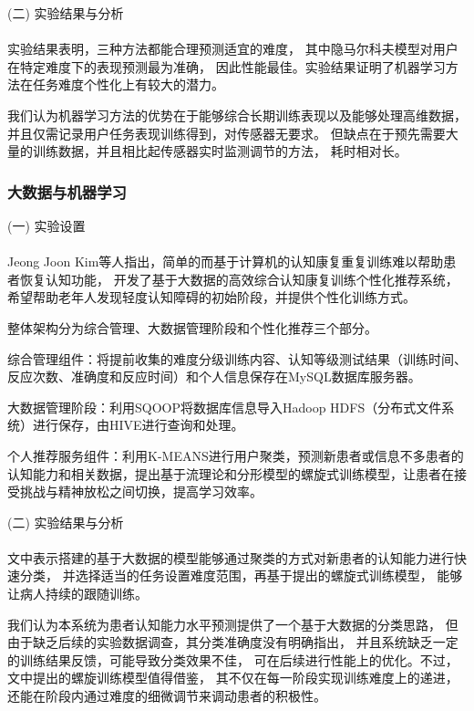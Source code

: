 \documentclass{article}
\begin{document}
            (二) 实验结果与分析\paragraph{}
            实验结果表明，三种方法都能合理预测适宜的难度，
            其中隐马尔科夫模型对用户在特定难度下的表现预测最为准确，
            因此性能最佳。实验结果证明了机器学习方法在任务难度个性化上有较大的潜力。

            我们认为机器学习方法的优势在于能够综合长期训练表现以及能够处理高维数据，
            并且仅需记录用户任务表现训练得到，对传感器无要求。
            但缺点在于预先需要大量的训练数据，并且相比起传感器实时监测调节的方法，
            耗时相对长。

            \subsubsection{大数据与机器学习}
            (一) 实验设置\paragraph{}
            Jeong Joon Kim等人指出，简单的而基于计算机的认知康复重复训练难以帮助患者恢复认知功能，
            开发了基于大数据的高效综合认知康复训练个性化推荐系统，
            希望帮助老年人发现轻度认知障碍的初始阶段，并提供个性化训练方式。

            整体架构分为综合管理、大数据管理阶段和个性化推荐三个部分。

            综合管理组件：将提前收集的难度分级训练内容、认知等级测试结果（训练时间、反应次数、准确度和反应时间）和个人信息保存在MySQL数据库服务器。
 
            大数据管理阶段：利用SQOOP将数据库信息导入Hadoop HDFS（分布式文件系统）进行保存，由HIVE进行查询和处理。

            个人推荐服务组件：利用K-MEANS进行用户聚类，预测新患者或信息不多患者的认知能力和相关数据，提出基于流理论和分形模型的螺旋式训练模型，让患者在接受挑战与精神放松之间切换，提高学习效率。

            (二) 实验结果与分析\paragraph{}
            文中表示搭建的基于大数据的模型能够通过聚类的方式对新患者的认知能力进行快速分类，
            并选择适当的任务设置难度范围，再基于提出的螺旋式训练模型，
            能够让病人持续的跟随训练。

            我们认为本系统为患者认知能力水平预测提供了一个基于大数据的分类思路，
            但由于缺乏后续的实验数据调查，其分类准确度没有明确指出，
            并且系统缺乏一定的训练结果反馈，可能导致分类效果不佳，
            可在后续进行性能上的优化。不过，文中提出的螺旋训练模型值得借鉴，
            其不仅在每一阶段实现训练难度上的递进，
            还能在阶段内通过难度的细微调节来调动患者的积极性。
\end{document}

